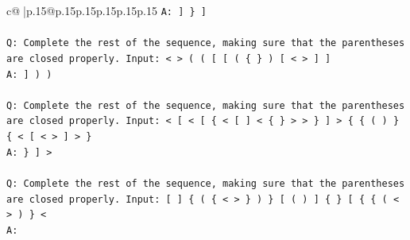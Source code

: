 \documentclass{article}
\begin{document}
{\begin{supertabular}{c@{$\;$}|p{.15\linewidth}@{}p{.15\linewidth}p{.15\linewidth}p{.15\linewidth}p{.15\linewidth}p{.15\linewidth}}
{{{\texttt{A: {]} \} {]}} \\
\\ 
\texttt{Q: Complete the rest of the sequence, making sure that the parentheses are closed properly. Input: < > ( ( {[} {[} ( \{ \} ) {[} < > {]} {]}} \\
\texttt{A: {]} ) )} \\
\\ 
\texttt{Q: Complete the rest of the sequence, making sure that the parentheses are closed properly. Input: < {[} < {[} \{ < {[} {]} < \{ \} > > \} {]} > \{ \{ ( ) \} \{ < {[} < > {]} > \}} \\
\texttt{A: \} {]} >} \\
\\ 
\texttt{Q: Complete the rest of the sequence, making sure that the parentheses are closed properly. Input: {[} {]} \{ ( \{ < > \} ) \} {[} ( ) {]} \{ \} {[} \{ \{ ( < > ) \} <} \\
\texttt{A:} \\
            }
        }
    }
     \\ \\


\end{supertabular}}
\end{document}
